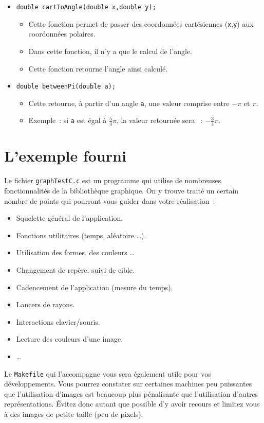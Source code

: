 \documentclass[12pt]{article}
\begin{document}
\begin{itemize}
\item \verb!double cartToAngle(double x,double y);!
      \begin{itemize}
      \item Cette fonction permet de passer des coordonn\'ees
            cart\'esiennes ({\tt x},{\tt y}) aux coordonn\'ees
            polaires.
      \item Dans cette fonction, il n'y a que le calcul de l'angle.
      \item Cette fonction retourne l'angle ainsi calcul\'e.
      \end{itemize}

\item \verb!double betweenPi(double a);!
      \begin{itemize}
      \item Cette retourne, \`a partir d'un angle {\tt a},
            une valeur comprise entre $-\pi$ et $\pi$.
      \item Exemple~: si {\tt a} est \'egal \`a $\frac{5}{4}\pi$,
            la valeur retourn\'ee sera ~: $-\frac{3}{4}\pi$.
      \end{itemize}


\end{itemize}


\newpage

\section{L'exemple fourni}

Le fichier \verb!graphTestC.c! est un programme qui utilise de nombreuses
fonctionnalit\'es de la biblioth\`eque graphique. On y trouve trait\'e
un certain nombre de points qui pourront vous guider dans votre
r\'ealisation~:
\begin{itemize}
\item Squelette g\'en\'eral de l'application.
\item Fonctions utilitaires (temps, al\'eatoire \ldots).
\item Utilisation des formes, des couleurs \ldots
\item Changement de rep\`ere, suivi de cible.
\item Cadencement de l'application (mesure du temps).
\item Lancers de rayons.
\item Interactions clavier/souris.
\item Lecture des couleurs d'une image.
\item \ldots
\end{itemize}
Le \verb!Makefile! qui l'accompagne vous sera \'egalement utile pour vos
d\'eveloppements.
Vous pourrez constater sur certaines machines peu puissantes que
l'utilisation d'images est beaucoup plus p\'enalisante que l'utilisation
d'autres repr\'esentations. \'Evitez donc autant que possible d'y avoir
recours et limitez vous \`a des images de petite taille (peu de pixels).
\end{document}
